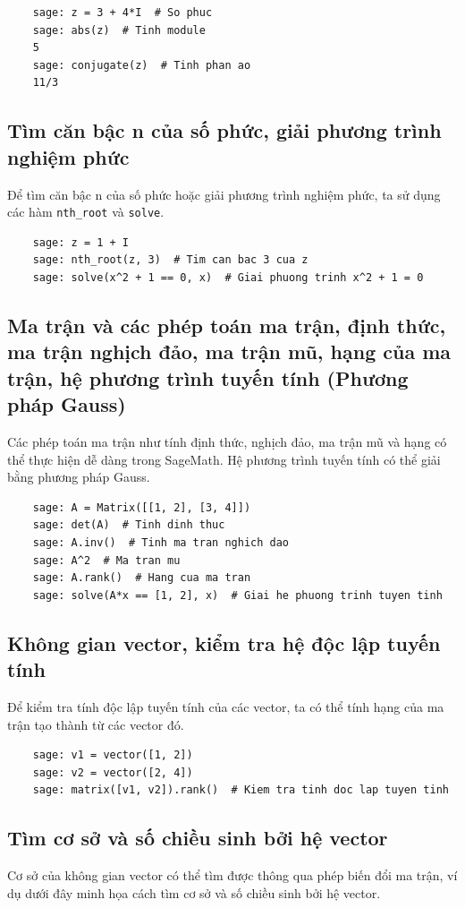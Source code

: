 \begin{lstlisting}
	sage: z = 3 + 4*I  # So phuc
	sage: abs(z)  # Tinh module
	5
	sage: conjugate(z)  # Tinh phan ao
	11/3
\end{lstlisting}

\subsection{Tìm căn bậc n của số phức, giải phương trình nghiệm phức}
Để tìm căn bậc n của số phức hoặc giải phương trình nghiệm phức, ta sử dụng các hàm \texttt{nth\_root} và \texttt{solve}.

\begin{lstlisting}
	sage: z = 1 + I
	sage: nth_root(z, 3)  # Tim can bac 3 cua z
	sage: solve(x^2 + 1 == 0, x)  # Giai phuong trinh x^2 + 1 = 0
\end{lstlisting}

\subsection{Ma trận và các phép toán ma trận, định thức, ma trận nghịch đảo, ma trận mũ, hạng của ma trận, hệ phương trình tuyến tính (Phương pháp Gauss)}
Các phép toán ma trận như tính định thức, nghịch đảo, ma trận mũ và hạng có thể thực hiện dễ dàng trong SageMath. Hệ phương trình tuyến tính có thể giải bằng phương pháp Gauss.

\begin{lstlisting}
	sage: A = Matrix([[1, 2], [3, 4]])
	sage: det(A)  # Tinh dinh thuc
	sage: A.inv()  # Tinh ma tran nghich dao
	sage: A^2  # Ma tran mu
	sage: A.rank()  # Hang cua ma tran
	sage: solve(A*x == [1, 2], x)  # Giai he phuong trinh tuyen tinh
\end{lstlisting}

\subsection{Không gian vector, kiểm tra hệ độc lập tuyến tính}
Để kiểm tra tính độc lập tuyến tính của các vector, ta có thể tính hạng của ma trận tạo thành từ các vector đó.

\begin{lstlisting}
	sage: v1 = vector([1, 2])
	sage: v2 = vector([2, 4])
	sage: matrix([v1, v2]).rank()  # Kiem tra tinh doc lap tuyen tinh
\end{lstlisting}

\subsection{Tìm cơ sở và số chiều sinh bởi hệ vector}
Cơ sở của không gian vector có thể tìm được thông qua phép biến đổi ma trận, ví dụ dưới đây minh họa cách tìm cơ sở và số chiều sinh bởi hệ vector.

